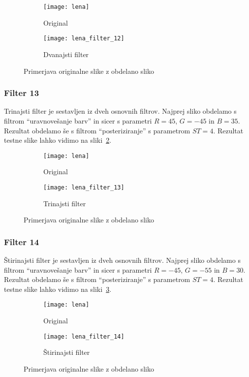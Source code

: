\begin{figure}[!ht]
    \centering
    \begin{subfigure}[b]{0.4\textwidth}
        \texttt{[image: lena]}
        \caption{Original}
    \end{subfigure}
    \begin{subfigure}[b]{0.4\textwidth}
        \texttt{[image: lena\_filter\_12]}
        \caption{Dvanajsti filter}
    \end{subfigure}
    \caption{Primerjava originalne slike z obdelano sliko}
    \label{fig:lena_filter_12}
\end{figure}


\subsubsection*{Filter 13}
Trinajsti filter je sestavljen iz dveh osnovnih filtrov. Najprej sliko obdelamo s
filtrom ``uravnovešanje barv'' in sicer s parametri $R = 45$, $G = -45$ in
$B = 35$. Rezultat obdelamo še s filtrom ``posteriziranje'' s parametrom
$ST =4$. Rezultat testne slike lahko vidimo na sliki~\ref{fig:lena_filter_13}.

\begin{figure}[!ht]
    \centering
    \begin{subfigure}[b]{0.4\textwidth}
        \texttt{[image: lena]}
        \caption{Original}
    \end{subfigure}
    \begin{subfigure}[b]{0.4\textwidth}
        \texttt{[image: lena\_filter\_13]}
        \caption{Trinajsti filter}
    \end{subfigure}
    \caption{Primerjava originalne slike z obdelano sliko}
    \label{fig:lena_filter_13}
\end{figure}


\subsubsection*{Filter 14}
Štirinajsti filter je sestavljen iz dveh osnovnih filtrov. Najprej sliko obdelamo s
filtrom ``uravnovešanje barv'' in sicer s parametri $R = -45$, $G = -55$ in
$B = 30$. Rezultat obdelamo še s filtrom ``posteriziranje'' s parametrom
$ST =4$. Rezultat testne slike lahko vidimo na sliki~\ref{fig:lena_filter_14}.

\begin{figure}[!ht]
    \centering
    \begin{subfigure}[b]{0.4\textwidth}
        \texttt{[image: lena]}
        \caption{Original}
    \end{subfigure}
    \begin{subfigure}[b]{0.4\textwidth}
        \texttt{[image: lena\_filter\_14]}
        \caption{Štirinajsti filter}
    \end{subfigure}
    \caption{Primerjava originalne slike z obdelano sliko}
    \label{fig:lena_filter_14}
\end{figure}


